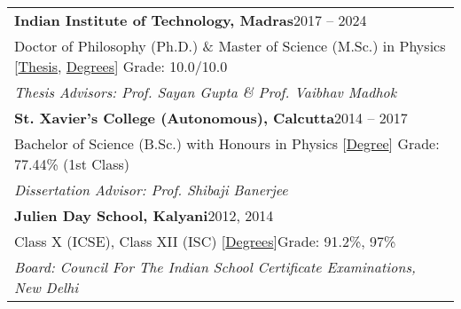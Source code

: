 
\noindent
\begin{tabular}{@{} m{18.5cm}}
\textbf{Indian Institute of Technology, Madras}\hfill 2017 -- 2024\\
Doctor of Philosophy (Ph.D.) \& Master of Science (M.Sc.) in Physics [\href{https://shodhganga.inflibnet.ac.in/handle/10603/609844}{Thesis}, \href{https://drive.google.com/file/d/1e_EdV3adnDxSkRCMAQGF4_j8DAEQHmok/view?usp=sharing}{Degrees}] \hfill Grade: 10.0/10.0\\
\textit{Thesis Advisors: Prof. Sayan Gupta \& Prof. Vaibhav Madhok}\\[0.3cm]

\textbf{St. Xavier's College (Autonomous), Calcutta}\hfill 2014 -- 2017\\
Bachelor of Science (B.Sc.) with Honours in Physics [\href{https://drive.google.com/file/d/1kzH1EiCFbbcnvpbOTWJMMhiCC53tkvDD/view?usp=sharing}{Degree}] \hfill Grade: 77.44\% (1st Class)\\
\textit{Dissertation Advisor: Prof. Shibaji Banerjee}\\[0.3cm]

\textbf{Julien Day School, Kalyani}\hfill 2012, 2014\\
Class X (ICSE), Class XII (ISC) [\href{https://drive.google.com/file/d/1rBzB5cY0d9NKxEajnIj6dx8uzIBc41sh/view?usp=sharing}{Degrees}]\hfill Grade: 91.2\%, 97\%\\
\textit{Board: Council For The Indian School Certificate Examinations, New Delhi}
\end{tabular}